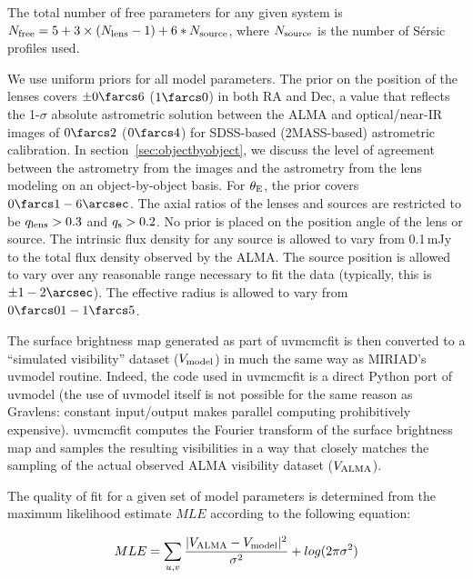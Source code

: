\documentclass[iop]{emulateapj}
\begin{document}
The total number of free parameters for any given system is $N_{\rm free} = 5 +
3 \times (N_{\rm lens} - 1) + 6 * N_{\rm source}$, where $N_{\rm source}$ is
the number of S\'ersic profiles used.

We use uniform priors for all model parameters.  The prior on the position of
the lenses covers $\pm0\farcs6$ ($1\farcs0$) in both RA and Dec, a value that
reflects the 1-$\sigma$ absolute astrometric solution between the ALMA and
optical/near-IR images of $0\farcs2$ ($0\farcs4$) for SDSS-based (2MASS-based)
astrometric calibration.  In section~\ref{sec:objectbyobject}, we discuss the
level of agreement between the astrometry from the images and the astrometry
from the lens modeling on an object-by-object basis.  For $\theta_{\rm E}$, the
prior covers $0\farcs1 - 6\arcsec$.  The axial ratios of the lenses and sources
are restricted to be $q_{\rm lens} > 0.3$ and $q_{\rm s} > 0.2$. No prior is
placed on the position angle of the lens or source.  The intrinsic flux density
for any source is allowed to vary from 0.1$\,$mJy to the total flux density
observed by the ALMA.  The source position is allowed to vary over any
reasonable range necessary to fit the data (typically, this is $\pm
1-2\arcsec$).  The effective radius is allowed to vary from $0\farcs01 -
1\farcs5$.

The surface brightness map generated as part of {\sc uvmcmcfit} is then
converted to a ``simulated visibility'' dataset ($V_{\rm model}$) in much the
same way as MIRIAD's {\sc uvmodel} routine.  Indeed, the code used in {\sc
uvmcmcfit} is a direct Python port of {\sc uvmodel} (the use of {\sc uvmodel}
itself is not possible for the same reason as {\sc Gravlens}: constant
input/output makes parallel computing prohibitively expensive).  {\sc
uvmcmcfit} computes the Fourier transform of the surface brightness map and
samples the resulting visibilities in a way that closely matches the sampling
of the actual observed ALMA visibility dataset ($V_{\rm ALMA}$).

The quality of fit for a given set of model parameters is determined from the
maximum likelihood estimate $MLE$ according to the following equation:

\begin{equation}
    MLE = \sum_{u, v} \frac{|V_{\rm ALMA} - V_{\rm
    model}|^2}{\sigma^2} + log(2 \pi \sigma^2) 
\end{equation}

\end{document}
